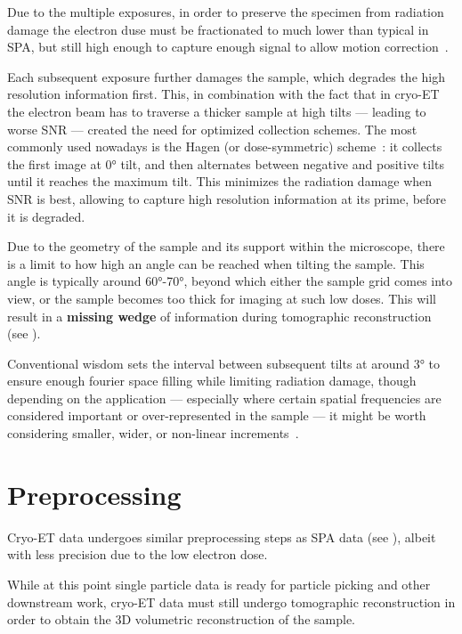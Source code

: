 Due to the multiple exposures, in order to preserve the specimen from radiation damage the electron duse must be fractionated to much lower than typical in SPA, but still high enough to capture enough signal to allow motion correction~\cite{mcewenRelevanceDosefractionationTomography1995}.

Each subsequent exposure further damages the sample, which degrades the high resolution information first.
This, in combination with the fact that in cryo-ET the electron beam has to traverse a thicker sample at high tilts --- leading to worse SNR --- created the need for optimized collection schemes.
The most commonly used nowadays is the Hagen (or dose-symmetric)  scheme~\cite{hagenImplementationCryoelectronTomography2017}: it collects the first image at \ang{0} tilt, and then alternates between negative and positive tilts until it reaches the maximum tilt.
This minimizes the radiation damage when SNR is best, allowing to capture high resolution information at its prime, before it is degraded.

Due to the geometry of the sample and its support within the microscope, there is a limit to how high an angle can be reached when tilting the sample.
This angle is typically around \ang{60}-\ang{70}, beyond which either the sample grid comes into view, or the sample becomes too thick for imaging at such low doses.
This will result in a \textbf{missing wedge} of information during tomographic reconstruction (see ).

Conventional wisdom sets the interval between subsequent tilts at around \ang{3} to ensure enough fourier space filling while limiting radiation damage, though depending on the application --- especially where certain spatial frequencies are considered important or over-represented in the sample --- it might be worth considering smaller, wider, or non-linear increments~\cite{copeCryoElectronTomographyStructural2011}.

\section{Preprocessing}
Cryo-ET data undergoes similar preprocessing steps as SPA data (see ), albeit with less precision due to the low electron dose.

While at this point single particle data is ready for particle picking and other downstream work, cryo-ET data must still undergo tomographic reconstruction in order to obtain the 3D volumetric reconstruction of the sample.

